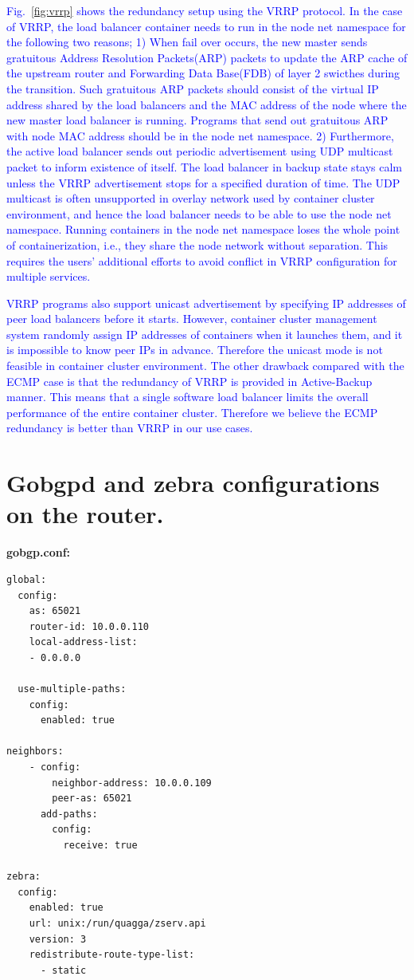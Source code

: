 \textcolor{blue}{
Fig.~\ref{fig:vrrp} shows the redundancy setup using the VRRP protocol.
In the case of VRRP, the load balancer container needs to run in the node net namespace for the following two reasons;
1) When fail over occurs, the new master sends gratuitous Address Resolution Packets(ARP) packets to update the ARP cache of the upstream router and Forwarding Data Base(FDB) of layer 2 swicthes during the transition.
Such gratuitous ARP packets should consist of the virtual IP address shared by the load balancers and the MAC address of the node where the new master load balancer is running.
Programs that send out gratuitous ARP with node MAC address should be in the node net namespace.
%
2) Furthermore, the active load balancer sends out periodic advertisement using UDP multicast packet to inform existence of itself.
The load balancer in backup state stays calm unless the VRRP advertisement stops for a specified duration of time.
The UDP multicast is often unsupported in overlay network used by container cluster environment, and hence the load balancer needs to be able to use the node net namespace.
%
Running containers in the node net namespace loses the whole point of containerization, i.e., they share the node network without separation.
This requires the users' additional efforts to avoid conflict in VRRP configuration for multiple services.
%
}

\textcolor{blue}{
VRRP programs also support unicast advertisement by specifying IP addresses of peer load balancers before it starts.
However, container cluster management system randomly assign IP addresses of containers when it launches them, and it is impossible to know peer IPs in advance. 
Therefore the unicast mode is not feasible in container cluster environment.
}
\textcolor{blue}{
The other drawback compared with the ECMP case is that the redundancy of VRRP is provided in Active-Backup manner.
This means that a single software load balancer limits the overall performance of the entire container cluster.
Therefore we believe the ECMP redundancy is better than VRRP in our use cases.
}

\section{Gobgpd and zebra configurations on the router.}

{\bf\normalsize gobgp.conf:}
\begin{verbatim}
global:
  config:
    as: 65021
    router-id: 10.0.0.110
    local-address-list:
    - 0.0.0.0

  use-multiple-paths:
    config:
      enabled: true

neighbors:
    - config:
        neighbor-address: 10.0.0.109
        peer-as: 65021
      add-paths:
        config:
          receive: true

zebra:
  config:
    enabled: true
    url: unix:/run/quagga/zserv.api
    version: 3
    redistribute-route-type-list: 
      - static

\end{verbatim}
\label{appendix:router_config}

